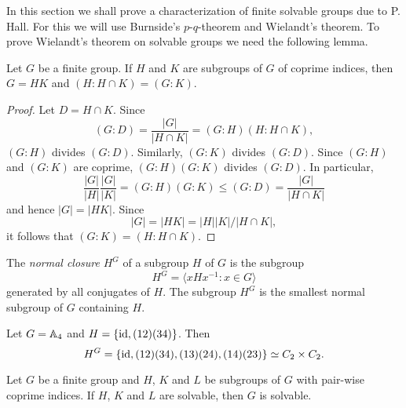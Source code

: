 In this section we shall prove a characterization of finite solvable groups due to P. Hall. For this we will use Burnside's $p$-$q$-theorem and Wielandt's theorem.
To prove Wielandt's theorem on solvable groups 
we need the following lemma.  

\begin{lemma}
	\label{lemma:4Wielandt}
	Let $G$ be a finite group. If $H$ and $K$ are subgroups of $G$ of coprime indices, then 
    $G=HK$ and $(H:H\cap K)=(G:K)$.
\end{lemma}

\begin{proof}
	Let $D=H\cap K$. Since
	\[
	(G:D)=\frac{|G|}{|H\cap K|}=(G:H)(H:H\cap K),
	\]
	$(G:H)$ divides $(G:D)$. Similarly, $(G:K)$ divides 
	$(G:D)$. Since $(G:H)$ and $(G:K)$ are coprime, $(G:H)(G:K)$
	divides $(G:D)$. In particular, 
	\[
	\frac{|G|}{|H|}\frac{|G|}{|K|}=(G:H)(G:K)\leq (G:D)=\frac{|G|}{|H\cap K|}
	\]
	and hence $|G|=|HK|$. Since 
	\[
	|G|=|HK|=|H||K|/|H\cap K|, 
	\]
	it follows that 
	$(G:K)=(H:H\cap K)$.
\end{proof}

The 
{\em normal closure} $H^G$ of a subgroup $H$ of $G$ is the subgroup
\[
	H^G=\langle xHx^{-1}:x\in G\rangle
\]
generated by all conjugates of $H$. The 
subgroup $H^G$ is the smallest normal subgroup of $G$ containing $H$. 

\begin{example}
	Let $G=\mathbb{A}_4$ and $H=\{\operatorname{id},(12)(34)\}$. Then 
	\[
	H^G=\{\operatorname{id},(12)(34),(13)(24),(14)(23)\}\simeq C_2\times C_2.
	\]
\end{example}


\begin{theorem}[Wielandt]
	\label{theorem:Wielandt:solvable}
	Let $G$ be a finite group and $H$, $K$ and $L$ be subgroups of $G$ 
	with pair-wise coprime indices. If $H$, $K$ and $L$ are solvable, 
	then $G$ is solvable. 
\end{theorem}

